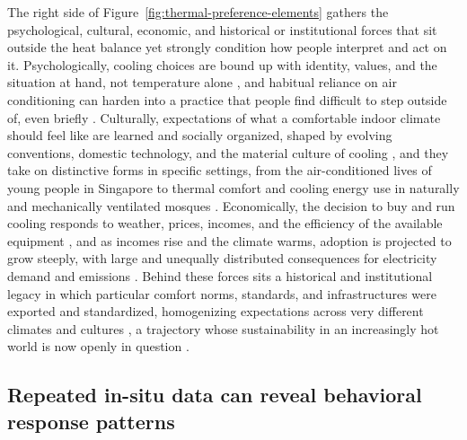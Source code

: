 \documentclass[final,5p,times,twocolumn]{elsarticle}
\begin{document}
The right side of Figure~\ref{fig:thermal-preference-elements} gathers the psychological, cultural, economic, and historical or institutional forces that sit outside the heat balance yet strongly condition how people interpret and act on it.
Psychologically, cooling choices are bound up with identity, values, and the situation at hand, not temperature alone \citep{Osunmuyiwa2020-fr}, and habitual reliance on air conditioning can harden into a practice that people find difficult to step outside of, even briefly \citep{Hitchings2011-eo}.
Culturally, expectations of what a comfortable indoor climate should feel like are learned and socially organized, shaped by evolving conventions, domestic technology, and the material culture of cooling \citep{Shove2014-fx, Strengers2011-bm, Goodchild2020-ew}, and they take on distinctive forms in specific settings, from the air-conditioned lives of young people in Singapore \citep{Hitchings2008-ky} to thermal comfort and cooling energy use in naturally and mechanically ventilated mosques \citep{Atmaca2019-ur}.
Economically, the decision to buy and run cooling responds to weather, prices, incomes, and the efficiency of the available equipment \citep{He2022-rg, Noonan2015-uz, Yun2011-nu}, and as incomes rise and the climate warms, adoption is projected to grow steeply, with large and unequally distributed consequences for electricity demand and emissions \citep{Davis2015-po, Colelli2023-fy, Falchetta2024-ao, Zhang2026-cx}.
Behind these forces sits a historical and institutional legacy in which particular comfort norms, standards, and infrastructures were exported and standardized, homogenizing expectations across very different climates and cultures \citep{Roaf2026-kt, Williamson2025-nt, Healy2008-hk, Winter2013-tm}, a trajectory whose sustainability in an increasingly hot world is now openly in question \citep{Lundgren-Kownacki2018-bv}.

\subsection{Repeated in-situ data can reveal behavioral response patterns}\label{sec:longitudinal-data}
\end{document}
